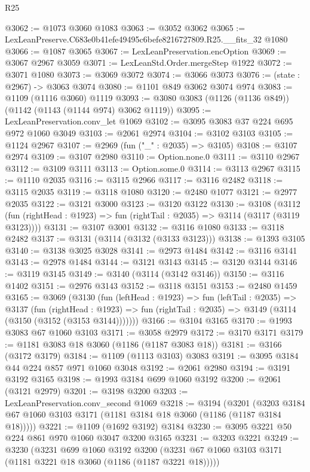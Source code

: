 \begin{lexlean}{R25}
\begin{coremodule}
@3062 := @1073 @3060 @1083
@3063 := @3052 @3062
@3065 := LexLeanPreserve.C683e0b41efe49495c6befe8216727809.R25.__fits_32 @1080
@3066 := @1087 @3065
@3067 := LexLeanPreservation.encOption
@3069 := @3067 @2967 @3059
@3071 := LexLeanStd.Order.mergeStep @1922
@3072 := @3071 @1080
@3073 := @3069 @3072
@3074 := @3066 @3073
@3076 := (state : @2967) -> @3063 @3074
@3080 := @1101 @849 @3062 @3074 @974
@3083 := @1109 (@1116 @3060) @1119
@3093 := @3080 @3083 (@1126 (@1136 @849)) (@1142 (@1143 (@1144 @974) @3062 @1119))
@3095 := LexLeanPreservation.conv_let @1069
@3102 := @3095 @3083 @37 @224 @695 @972 @1060 @3049
@3103 := @2061 @2974
@3104 := @3102 @3103
@3105 := @1124 @2967
@3107 := @2969 (fun ("_" : @2035) => @3105)
@3108 := @3107 @2974
@3109 := @3107 @2980
@3110 := Option.none.{0}
@3111 := @3110 @2967
@3112 := @3109 @3111
@3113 := Option.some.{0}
@3114 := @3113 @2967
@3115 := @1110 @2035
@3116 := @3115 @2966
@3117 := @3116 @2482
@3118 := @3115 @2035
@3119 := @3118 @1080
@3120 := @2480 @1077
@3121 := @2977 @2035
@3122 := @3121 @3000
@3123 := @3120 @3122
@3130 := @3108
    (@3112 (fun (rightHead : @1923) => fun (rightTail : @2035) => @3114 (@3117 (@3119 @3123))))
@3131 := @3107 @3001
@3132 := @3116 @1080
@3133 := @3118 @2482
@3137 := @3131 (@3114 (@3132 (@3133 @3123)))
@3138 := @1393 @3105
@3140 := @3138 @3025 @3028
@3141 := @2973 @1484
@3142 := @3116 @3141
@3143 := @2978 @1484
@3144 := @3121 @3143
@3145 := @3120 @3144
@3146 := @3119 @3145
@3149 := @3140 (@3114 (@3142 @3146))
@3150 := @3116 @1402
@3151 := @2976 @3143
@3152 := @3118 @3151
@3153 := @2480 @1459
@3165 := @3069
    (@3130
      (fun (leftHead : @1923) =>
      fun (leftTail : @2035) =>
      @3137
        (fun (rightHead : @1923) =>
        fun (rightTail : @2035) => @3149 (@3114 (@3150 (@3152 (@3153 @3144)))))))
@3166 := @3104 @3165
@3170 := @1993 @3083 @67 @1060 @3103
@3171 := @3058 @2979
@3172 := @3170 @3171
@3179 := @1181 @3083 @18 @3060 (@1186 (@1187 @3083 @18))
@3181 := @3166 (@3172 @3179)
@3184 := @1109 (@1113 @3103) @3083
@3191 := @3095 @3184 @44 @224 @857 @971 @1060 @3048
@3192 := @2061 @2980
@3194 := @3191 @3192 @3165
@3198 := @1993 @3184 @699 @1060 @3192
@3200 := @2061 (@3121 @2979)
@3201 := @3198 @3200
@3203 := LexLeanPreservation.conv_second @1069
@3218 := @3194
    (@3201 (@3203 @3184 @67 @1060 @3103 @3171 (@1181 @3184 @18 @3060 (@1186 (@1187 @3184 @18)))))
@3221 := @1109 (@1692 @3192) @3184
@3230 := @3095 @3221 @50 @224 @861 @970 @1060 @3047 @3200 @3165
@3231 := @3203 @3221
@3249 := @3230
    (@3231
      @699
      @1060
      @3192
      @3200
      (@3231 @67 @1060 @3103 @3171 (@1181 @3221 @18 @3060 (@1186 (@1187 @3221 @18)))))

\end{coremodule}
\end{lexlean}
